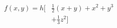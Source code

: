 \documentclass[a4paper]{article}
\begin{document}
    \begin{equation}
    \begin{split}
    f(x,y)=h \biggl[ & \frac{1}{2}(x+y)+x^2+y^3\\
    & +\frac{1}{3}z^2\biggr]
    \end{split}
    \end{equation}
\end{document}
